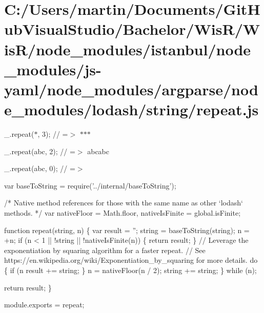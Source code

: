 \hypertarget{_c_1_2_users_2martin_2_documents_2_git_hub_visual_studio_2_bachelor_2_wis_r_2_wis_r_2node_module161f6b309a3469cb13a2f0458b2c6821}{}\section{C\+:/\+Users/martin/\+Documents/\+Git\+Hub\+Visual\+Studio/\+Bachelor/\+Wis\+R/\+Wis\+R/node\+\_\+modules/istanbul/node\+\_\+modules/js-\/yaml/node\+\_\+modules/argparse/node\+\_\+modules/lodash/string/repeat.\+js}
\+\_\+.\+repeat(\textquotesingle{}$\ast$\textquotesingle{}, 3); // =$>$ \textquotesingle{}$\ast$$\ast$$\ast$\textquotesingle{}

\+\_\+.\+repeat(\textquotesingle{}abc\textquotesingle{}, 2); // =$>$ \textquotesingle{}abcabc\textquotesingle{}

\+\_\+.\+repeat(\textquotesingle{}abc\textquotesingle{}, 0); // =$>$ \textquotesingle{}\textquotesingle{}


\begin{DoxyCodeInclude}
var baseToString = require(\textcolor{stringliteral}{'../internal/baseToString'});

\textcolor{comment}{/* Native method references for those with the same name as other `lodash` methods. */}
var nativeFloor = Math.floor,
    nativeIsFinite = global.isFinite;

\textcolor{keyword}{function} repeat(\textcolor{keywordtype}{string}, n) \{
  var result = \textcolor{stringliteral}{''};
  \textcolor{keywordtype}{string} = baseToString(\textcolor{keywordtype}{string});
  n = +n;
  \textcolor{keywordflow}{if} (n < 1 || !\textcolor{keywordtype}{string} || !nativeIsFinite(n)) \{
    \textcolor{keywordflow}{return} result;
  \}
  \textcolor{comment}{// Leverage the exponentiation by squaring algorithm for a faster repeat.}
  \textcolor{comment}{// See https://en.wikipedia.org/wiki/Exponentiation\_by\_squaring for more details.}
  \textcolor{keywordflow}{do} \{
    \textcolor{keywordflow}{if} (n %
      result += string;
    \}
    n = nativeFloor(n / 2);
    \textcolor{keywordtype}{string} += string;
  \} \textcolor{keywordflow}{while} (n);

  \textcolor{keywordflow}{return} result;
\}

module.exports = repeat;
\end{DoxyCodeInclude}
 